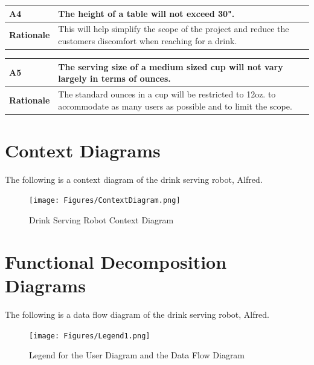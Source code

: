 \documentclass [11pt]{article}
\begin{document}
\begin{longtable}{| p{ } | p{ } | }\hline 
\rowcolor{tableCell}\textbf{A4} & The height of a table will not exceed 30". \\ \hline
\textbf{Rationale} &  This will help simplify the scope of the project and reduce the customers discomfort when reaching for a drink.\\ \hline
\end{longtable}

\begin{longtable}{| p{ } | p{ } | }\hline 
\rowcolor{tableCell}\textbf{A5} & The serving size of a medium sized cup will not vary largely in terms of ounces. \\ \hline
\textbf{Rationale} &  The standard ounces in a cup will be restricted to 12oz. to accommodate as many users as possible and to limit the scope. \\ \hline
\end{longtable}



\pagebreak
\section{Context Diagrams}
The following is a context diagram of the drink serving robot, Alfred.
\begin{figure} [h!]
	\centering
	\texttt{[image: Figures/ContextDiagram.png]}
	\caption{Drink Serving Robot Context Diagram}
\end{figure}



\pagebreak
\section{Functional Decomposition Diagrams}
The following is a data flow diagram of the drink serving robot, Alfred.

\begin{figure} [h!]
	\centering
	\texttt{[image: Figures/Legend1.png]}
	\caption{Legend for the User Diagram and the Data Flow Diagram}
\end{figure}
\end{document}
